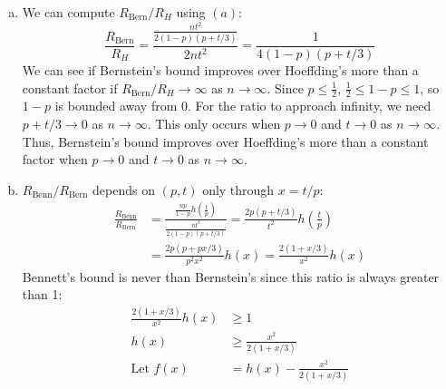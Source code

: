 \documentclass[11pt,a4paper,margin=1in]{article}
\begin{document}
\begin{enumerate}[(a)]
\begin{itemize}
        thus, $R_{\text{Bern}} = \frac{nt^2}{2(1 - p)(p + t/3)}$.
        \item \textbf{Bennett's inequality:} Using the same $X_i$ as above, Bennett's 
        inequality gives:
        \begin{align*}
            P\left(\sum_{i=1}^{n} X_i \geq s\right) &\leq \exp\left(-\frac{v}{b^2} h\left(\frac{bs}{v}\right)\right), \text{ using } s,v,b \therefore \\
            P\left(\sum_{i=1}^{n} X_i \geq nt\right) &\leq \exp\left(-\frac{np(1 - p)}{(1 - p)^2} h\left(\frac{(1 - p)nt}{np(1 - p)}\right)\right) \\
            &= \exp\left(-\frac{np}{1 - p} h\left(\frac{t}{p}\right)\right)
        \end{align*}
        thus, $R_{\text{Benn}} = \frac{np}{1 - p} h\left(\frac{t}{p}\right)$.
    \end{itemize}
    \item We can compute $R_{\text{Bern}}/R_H$ using $(a)$:
    \[
        \frac{R_{\text{Bern}}}{R_H} = \frac{\frac{nt^2}{2(1 - p)(p + t/3)}}{2nt^2} = \frac{1}{4(1 - p)(p + t/3)}
    \]
    We can see if Bernstein's bound improves over Hoeffding's more than a constant
    factor if $R_{\text{Bern}}/R_H \to \infty$ as $n \to \infty$. Since $p \leq \frac{1}{2}$,
    $\frac{1}{2} \leq 1 - p \leq 1$, so $1 - p$ is bounded away from 0. For the
    ratio to approach infinity, we need $p + t/3 \to 0$ as $n \to \infty$. This
    only occurs when $p \to 0$ and $t \to 0$ as $n \to \infty$. Thus, Bernstein's 
    bound improves over Hoeffding's more than a constant factor when $p \to 0$ and 
    $t \to 0$ as $n \to \infty$.
    \item $R_{\text{Benn}}/R_{\text{Bern}}$ depends on $(p, t)$ only through $x = t/p$:
    \begin{align*}
        \frac{R_{\text{Benn}}}{R_{\text{Bern}}} &= \frac{\frac{np}{1 - p} h\left(\frac{t}{p}\right)}{\frac{nt^2}{2(1 - p)(p + t/3)}} = \frac{2p(p + t/3)}{t^2} h\left(\frac{t}{p}\right) \\
        &= \frac{2p(p + px/3)}{p^2 x^2} h(x) = \frac{2(1 + x/3)}{x^2} h(x)
    \end{align*}
    Bennett's bound is never than Bernstein's since this ratio is always greater than 1:
    \begin{align*}
        \frac{2(1 + x/3)}{x^2} h(x) &\geq 1 \\
        h(x) &\geq \frac{x^2}{2(1 + x/3)} \\
        \text{Let } f(x) &= h(x) - \frac{x^2}{2(1 + x/3)} \\

\end{align*}
\end{enumerate}
\end{document}
